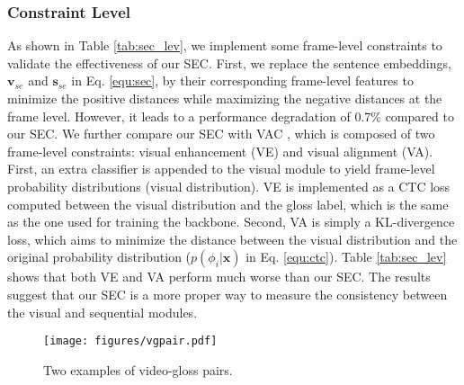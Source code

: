 \documentclass[acmsmall,screen]{acmart}
\def \mbf{\mathbf}
\begin{document}
\subsubsection{Constraint Level}
\label{sec:cons_lev}
As shown in Table \ref{tab:sec_lev}, we implement some frame-level constraints to validate the effectiveness of our SEC.
First, we replace the sentence embeddings, $\mbf{v}_{se}$ and $\mbf{s}_{se}$ in Eq. \ref{equ:sec}, by their corresponding frame-level features to minimize the positive distances while maximizing the negative distances at the frame level.
However, it leads to a performance degradation of 0.7\% compared to our SEC.
We further compare our SEC with VAC \cite{vac}, which is composed of two frame-level constraints: visual enhancement (VE) and visual alignment (VA).
First, an extra classifier is appended to the visual module to yield frame-level probability distributions (visual distribution).
VE is implemented as a CTC loss computed between the visual distribution and the gloss label, which is the same as the one used for training the backbone.
Second, VA is simply a KL-divergence loss, which aims to minimize the distance between the visual distribution and the original probability distribution ($p(\phi_i|\mbf{x})$ in Eq. \ref{equ:ctc}).
Table \ref{tab:sec_lev} shows that both VE and VA perform much worse than our SEC.
The results suggest that our SEC is a more proper way to measure the consistency between the visual and sequential modules.

\begin{figure}[t]
	\centering
	\texttt{[image: figures/vgpair.pdf]}
	\caption{Two examples of video-gloss pairs.}
	\label{fig:vgpair}
\end{figure}
\end{document}

